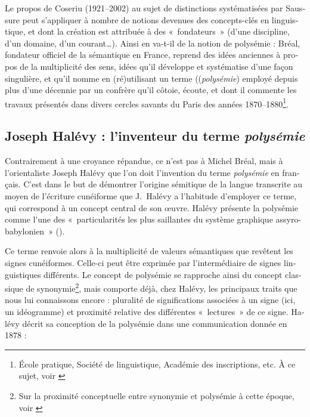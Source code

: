 \documentclass[output=paper]{langsci/langscibook}
\begin{document}
\begin{otherlanguage}{french}
Le propos de Coseriu (1921--2002) au sujet de distinctions systématisées par Saussure peut s’appliquer à nombre de notions devenues des concepts-clés en linguistique, et dont la création est attribuée à des «~fondateurs~» (d’une discipline, d’un domaine, d’un courant…). Ainsi en va-t-il de la notion de polysémie : Bréal, fondateur officiel de la sémantique en France, reprend des idées anciennes à propos de la multiplicité des sens, idées qu’il développe et systématise d’une façon singulière, et qu’il nomme en (ré)utilisant un terme ((\textit{polysémie}) employé depuis plus d’une décennie par un confrère qu’il côtoie, écoute, et dont il commente les travaux présentés dans divers cercles savants du Paris des années 1870--1880\footnote{ \textrm{École pratique, Société de linguistique, Académie des inscriptions, etc. À ce sujet, voir \citealt{courbon_sur_2015}}}.

\subsection{Joseph Halévy : l’inventeur du terme \textit{polysémie}}

Contrairement à une croyance répandue, ce n’est pas à Michel Bréal, mais à l’orientaliste Joseph Halévy que l’on doit l’invention du terme \textit{polysémie} en français. C’est dans le but de démontrer l’origine sémitique de la langue transcrite au moyen de l’écriture cunéiforme que J.~Halévy a l’habitude d’employer ce terme, qui correspond à un concept central de son œuvre. Halévy présente la polysémie comme l’une des «~particularités les plus saillantes du système graphique assyro-babylonien~» (\citealt[298]{halevy_recherches_1876}).

Ce terme renvoie alors à la multiplicité de valeurs sémantiques que revêtent les signes cunéiformes. Celle-ci peut être exprimée par l’intermédiaire de signes linguistiques différents. Le concept de polysémie se rapproche ainsi du concept classique de synonymie\footnote{ \textrm{Sur la proximité conceptuelle entre synonymie et polysémie à cette époque, voir \citealt{delesalle_statut_1986}}}, mais comporte déjà, chez Halévy, les principaux traits que nous lui connaissons encore : pluralité de significations associées à un signe (ici, un idéogramme) et proximité relative des différentes «~lectures~» de ce signe. Halévy décrit sa conception de la polysémie dans une communication donnée en 1878 :


\end{otherlanguage}
\end{document}

